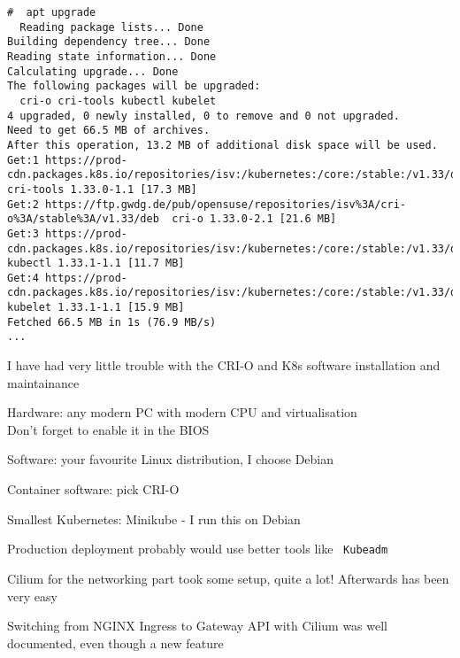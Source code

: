 \documentclass[Screen16to9,17pt]{foils}
\begin{document}

\begin{verbatim}
#  apt upgrade
  Reading package lists... Done
Building dependency tree... Done
Reading state information... Done
Calculating upgrade... Done
The following packages will be upgraded:
  cri-o cri-tools kubectl kubelet
4 upgraded, 0 newly installed, 0 to remove and 0 not upgraded.
Need to get 66.5 MB of archives.
After this operation, 13.2 MB of additional disk space will be used.
Get:1 https://prod-cdn.packages.k8s.io/repositories/isv:/kubernetes:/core:/stable:/v1.33/deb  cri-tools 1.33.0-1.1 [17.3 MB]
Get:2 https://ftp.gwdg.de/pub/opensuse/repositories/isv%3A/cri-o%3A/stable%3A/v1.33/deb  cri-o 1.33.0-2.1 [21.6 MB]
Get:3 https://prod-cdn.packages.k8s.io/repositories/isv:/kubernetes:/core:/stable:/v1.33/deb  kubectl 1.33.1-1.1 [11.7 MB]
Get:4 https://prod-cdn.packages.k8s.io/repositories/isv:/kubernetes:/core:/stable:/v1.33/deb  kubelet 1.33.1-1.1 [15.9 MB]
Fetched 66.5 MB in 1s (76.9 MB/s)
...
\end{verbatim}

\begin{list2}
\item I have had very little trouble with the CRI-O and K8s software installation and maintainance
\end{list2}





\begin{list2}
\item Hardware: any modern PC with modern CPU and virtualisation\\
Don't forget to enable it in the BIOS
\item Software: your favourite Linux distribution, I choose Debian
\item Container software: pick CRI-O
\item Smallest Kubernetes: Minikube -  I run this on Debian
\item Production deployment probably would use better tools like \faWrench\ \verb+Kubeadm+
\item Cilium for the networking part took some setup, quite a lot! Afterwards has been very easy
\item Switching from NGINX Ingress to Gateway API with Cilium was well documented, even though a new feature
\end{list2}
\end{document}
